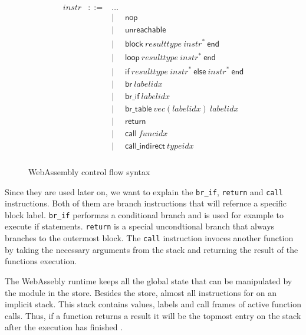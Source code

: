 \begin{figure}[h]
    \begin{equation}
        \begin{split}
            \begin{array}{llcl}
                \mathit{instr} &::=&
                \dots \\&&|&
                \mathsf{nop} \\&&|&
                \mathsf{unreachable} \\&&|&
                \mathsf{block}~\mathit{resulttype}~\mathit{instr}^\ast~\mathsf{end} \\&&|&
                \mathsf{loop}~\mathit{resulttype}~\mathit{instr}^\ast~\mathsf{end} \\&&|&
                \mathsf{if}~\mathit{resulttype}~\mathit{instr}^\ast~\mathsf{else}~\mathit{instr}^\ast~\mathsf{end} \\&&|&
                \mathsf{br}~\mathit{labelidx} \\&&|&
                \mathsf{br\_if}~\mathit{labelidx} \\&&|&
                \mathsf{br\_table}~\mathit{vec}(\mathit{labelidx})~\mathit{labelidx} \\&&|&
                \mathsf{return} \\&&|&
                \mathsf{call}~\mathit{funcidx} \\&&|&
                \mathsf{call\_indirect}~\mathit{typeidx} \\
            \end{array}
        \end{split}
    \end{equation}
    \caption{WebAssembly control flow syntax}
    \label{fig:control_flow}
\end{figure}

Since they are used later on, we want to explain the \lstinline{br_if}, \lstinline{return} and \lstinline{call} instructions. Both of them are branch instructions that will refernce a specific block label. \lstinline{br_if} performas a conditional branch and is used for example to execute if statements. \lstinline{return} is a special uncondtional branch that always branches to the outermost block. The \lstinline{call} instruction invoces another function by taking the necessary arguments from the stack and returning the result of the functions execution.

The WebAssebly runtime keeps all the global state that can be manipulated by the module in the store. Besides the store, almost all instructions for on an implicit stack. This stack contains values, labels and call frames of active function calls. Thus, if a function returns a result it will be the topmost entry on the stack after the execution has finished \autocite{noauthor_runtime_nodate}.

